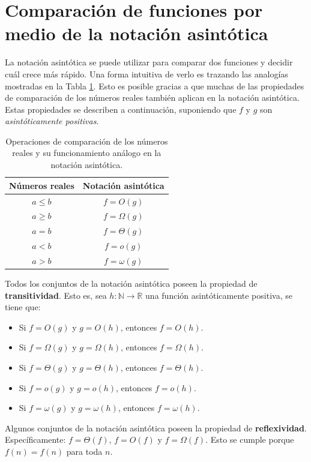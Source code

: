 \section{Comparación de funciones por medio de la notación asintótica}

La notación asintótica se puede utilizar para comparar dos funciones y decidir cuál crece más rápido. 
Una forma intuitiva de verlo es trazando las analogías mostradas en la Tabla \ref{tab:func-comp}. 
Esto es posible gracias a que muchas de las propiedades de comparación de los números reales también aplican en la notación asintótica. 
Estas propiedades se describen a continuación, suponiendo que \(f\) y \(g\) son \emph{asintóticamente positivas}.

\begin{table}
  \label{tab:func-comp}
  \caption{Operaciones de comparación de los números reales y su funcionamiento análogo en la notación asintótica.}
  \centering
  \begin{tabular}{cc}
    \toprule 
      Números reales & Notación asintótica\tabularnewline
    \midrule
      \(a\leq b\) & \(f=O(g)\)\tabularnewline
      \(a\ge b\) & \(f=\Omega(g)\)\tabularnewline
      \(a=b\) & \(f=\Theta(g)\)\tabularnewline
      \(a<b\) & \(f=o(g)\)\tabularnewline
      \(a>b\) & \(f=\omega(g)\)\tabularnewline
    \bottomrule
  \end{tabular}
\end{table}

Todos los conjuntos de la notación asintótica poseen la propiedad de \textbf{transitividad}.
Esto es, sea \(h:\mathbb{N}\to\mathbb{R}\) una función asintóticamente positiva, se tiene que:
\begin{itemize}
  \item Si \(f=O(g)\) y \(g=O(h)\), entonces \(f=O(h)\).
  \item Si \(f=\Omega(g)\) y \(g=\Omega(h)\), entonces \(f=\Omega(h)\).
  \item Si \(f=\Theta(g)\) y \(g=\Theta(h)\), entonces \(f=\Theta(h)\).
  \item Si \(f=o(g)\) y \(g=o(h)\), entonces \(f=o(h)\).
  \item Si \(f=\omega(g)\) y \(g=\omega(h)\), entonces \(f=\omega(h)\).
\end{itemize}

Algunos conjuntos de la notación asintótica poseen la propiedad de \textbf{reflexividad}. 
Específicamente: \(f=\Theta(f)\), \(f=O(f)\) y \(f=\Omega(f)\). 
Esto se cumple porque \(f(n)=f(n)\) para toda \(n\).

